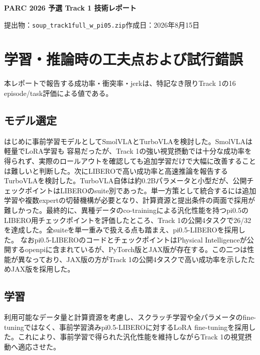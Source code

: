 \documentclass[10pt,a4paper]{article}
\newcommand{\code}[1]{\texttt{\small #1}}
\begin{document}
\begin{center}
  {\LARGE\bfseries PARC 2026 予選 Track 1 技術レポート}\par
  \vspace{0.35em}
  {\small 提出物：\code{soup\_track1full\_w\_pi05.zip}\quad 作成日：2026年8月15日}
\end{center}

\section{学習・推論時の工夫点および試行錯誤}

本レポートで報告する成功率・衝突率・jerkは、特記なき限りTrack 1の16 episode/task評価による値である。

\subsection{モデル選定}

はじめに事前学習モデルとしてSmolVLAとTurboVLAを検討した。SmolVLAは軽量でLoRA学習も
容易だったが、Track 1の強い視覚摂動では十分な成功率を得られず、実際のロールアウトを確認しても追加学習だけで大幅に改善することは難しいと判断した\cite{smolvla}。次にLIBEROで高い成功率と高速推論を報告するTurboVLAを検討した\cite{turbovla}。TurboVLA自体は約0.2Bパラメータと小型だが、公開チェックポイントはLIBEROのsuite別であった。単一方策として統合するには追加学習や複数expertの切替機構が必要となり、計算資源と提出条件の両面で採用が難しかった。最終的に、異種データのco-trainingによる汎化性能を持つpi0.5\cite{pi05}のLIBERO用チェックポイントを評価したところ、Track 1の公開4タスクで26/32を達成した。全suiteを単一重みで扱える点も踏まえ、pi0.5-LIBEROを採用した。
なおpi0.5-LIBEROのコードとチェックポイントはPhysical Intelligenceが公開するopenpiに含まれているが、PyTorch版とJAX版が存在する。この二つは性能が異なっており、JAX版の方がTrack 1の公開4タスクで高い成功率を示したためJAX版を採用した\cite{openpi}。

\subsection{学習}

利用可能なデータ量と計算資源を考慮し、スクラッチ学習や全パラメータのfine-tuningではなく、事前学習済みpi0.5-LIBEROに対するLoRA fine-tuningを採用した。これにより、事前学習で得られた汎化性能を維持しながらTrack 1の視覚摂動へ適応させた。
\end{document}
